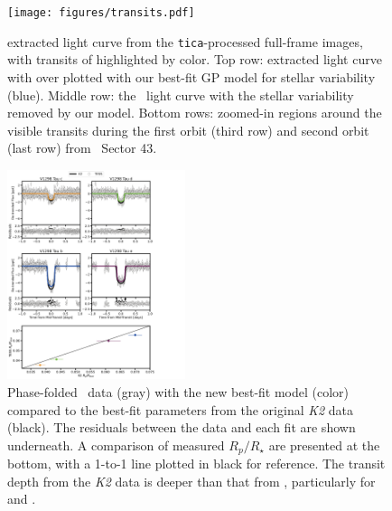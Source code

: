 \documentclass[twocolumn]{aastex631}
\begin{document}
\begin{figure}[!ht]
  \begin{centering}
    \texttt{[image: figures/transits.pdf]}
    \caption{\sname extracted light curve from the \texttt{tica}-processed full-frame images, with transits of \allplanets highlighted by color. Top row: extracted light curve with over plotted with our best-fit GP model for stellar variability (blue). Middle row: the \tess\ light curve with the stellar variability removed by our model. Bottom rows: zoomed-in regions around the visible transits during the first orbit (third row) and second orbit (last row) from \tess\ Sector 43.} 
    \label{fig:transits} 
  \end{centering}
\end{figure}


\begin{figure}[!ht]
  \begin{centering}
    \includegraphics[width=0.465\textwidth,trim={0.25cm 0 4.5cm 0}]{static/folded_compare.pdf}
    \caption{Phase-folded \tess\ data (gray) with the new best-fit model (color) compared to the best-fit parameters from the original \textit{K2} data (black). The residuals between the data and each fit are shown underneath. A comparison of measured $R_p/R_\star$ are presented at the bottom, with a 1-to-1 line plotted in black for reference. The transit depth from the \textit{K2} data is deeper than that from \tess, particularly for \planetb and \planete.} 
    \label{fig:compare}
  \end{centering}
\end{figure}
\end{document}
